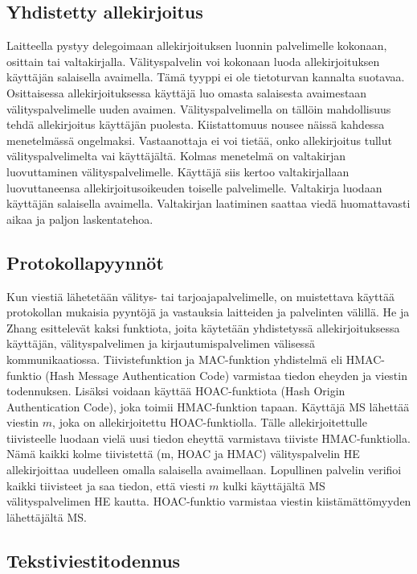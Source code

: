 \documentclass[finnish]{tktltiki2}
\theoremstyle{definition}
\theoremstyle{remark}
\begin{document}
\subsection{Yhdistetty allekirjoitus}

Laitteella pystyy delegoimaan allekirjoituksen luonnin palvelimelle kokonaan, osittain tai valtakirjalla. Välityspalvelin voi kokonaan luoda allekirjoituksen käyttäjän salaisella avaimella. Tämä tyyppi ei ole tietoturvan kannalta suotavaa. Osittaisessa allekirjoituksessa käyttäjä luo omasta salaisesta avaimestaan välityspalvelimelle uuden avaimen. Välityspalvelimella on tällöin mahdollisuus tehdä allekirjoitus käyttäjän puolesta. Kiistattomuus nousee näissä kahdessa menetelmässä ongelmaksi. Vastaanottaja ei voi tietää, onko allekirjoitus tullut välityspalvelimelta vai käyttäjältä. Kolmas menetelmä on valtakirjan luovuttaminen välityspalvelimelle. Käyttäjä siis kertoo valtakirjallaan luovuttaneensa allekirjoitusoikeuden toiselle palvelimelle. Valtakirja luodaan käyttäjän salaisella avaimella. Valtakirjan laatiminen saattaa viedä huomattavasti aikaa ja paljon laskentatehoa. \cite{joint}

\subsection{Protokollapyynnöt}

Kun viestiä lähetetään välitys- tai tarjoajapalvelimelle, on muistettava käyttää protokollan mukaisia pyyntöjä ja vastauksia laitteiden ja palvelinten välillä. He ja Zhang \cite{joint} esittelevät kaksi funktiota, joita käytetään yhdistetyssä allekirjoituksessa käyttäjän, välityspalvelimen ja kirjautumispalvelimen välisessä kommunikaatiossa. Tiivistefunktion ja MAC-funktion yhdistelmä eli HMAC-funktio (Hash Message Authentication Code) varmistaa tiedon eheyden ja viestin todennuksen. Lisäksi voidaan käyttää HOAC-funktiota (Hash Origin Authentication Code), joka toimii HMAC-funktion tapaan. Käyttäjä MS lähettää viestin $m$, joka on allekirjoitettu HOAC-funktiolla. Tälle allekirjoitettulle tiivisteelle luodaan vielä uusi tiedon eheyttä varmistava tiiviste HMAC-funktiolla. Nämä kaikki kolme tiivistettä (m, HOAC ja HMAC) välityspalvelin HE allekirjoittaa uudelleen omalla salaisella avaimellaan. Lopullinen palvelin verifioi kaikki tiivisteet ja saa tiedon, että viesti $m$ kulki käyttäjältä MS välityspalvelimen HE kautta. HOAC-funktio varmistaa viestin kiistämättömyyden lähettäjältä MS.

\subsection{Tekstiviestitodennus}
\end{document}
